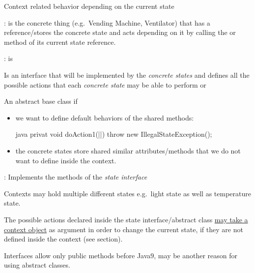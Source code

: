 \begin{figure}[H]	
  \centering
    \resizebox{\linewidth}{!}{\tikzset{font=\Huge}}
\end{figure}
\begin{intentbox}[Intent]\nospacing
    Context related behavior depending on the current state
\end{intentbox}
\begin{partbox}[Participants]\nospacing
  \begin{itemizenosep}
      \item {}: is the concrete thing (e.g.\ Vending Machine, Ventilator) that has a reference/stores the concrete state
      and acts depending on it by calling the  or  method of its current state reference.
      \item {}: is
    \begin{itemizenosep}
        \item Is an interface that will be implemented by the \textit{concrete states} and defines all the possible actions
        that each \textit{concrete state} may be able to perform or
          \item An abstract base class if
        \begin{itemize}
            \item we want to define default behaviors of the shared methods:
             \begin{mintlinebox}{java}
               privat void doAction1(||){
                 throw new IllegalStateException();
               }
             \end{mintlinebox}
            \item the concrete states store shared similar attributes/methods that we do not want to define inside the context.
        \end{itemize}
    \end{itemizenosep}
    \item {}: Implements the methods of the \textit{state interface}
  \end{itemizenosep}
\end{partbox}
\begin{notebox}[Note]\nospacing
  \begin{itemizenosep}
      \item Contexts may hold multiple different states e.g.\ light state as well as temperature state.
      \item The possible actions declared inside the state interface/abstract class \ul{may take a context object} as argument
      in order to change the current state, if they are not defined inside the context (see  section).
      \item Interfaces allow only public methods before Java9, may be another reason for using abstract classes.
  \end{itemizenosep}
\end{notebox}
